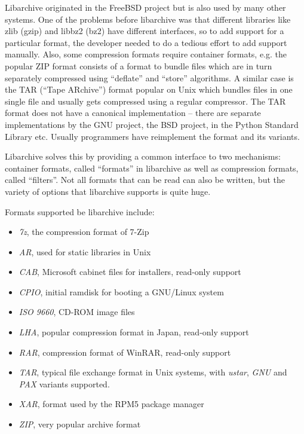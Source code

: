 \documentclass[parskip=half]{scrreprt}
\begin{document}
Libarchive originated in the FreeBSD project but is also used by many other
systems. One of the problems before libarchive was that different libraries
like zlib (gzip) and libbz2 (bz2) have different interfaces, so to add support
for a particular format, the developer needed to do a tedious effort to add
support manually. Also, some compression formats require container formats,
e.g. the popular ZIP format consists of a format to bundle files which are in
turn separately compressed using \enquote{deflate} and \enquote{store}
algorithms. A similar case is the TAR (\enquote{Tape ARchive}) format popular
on Unix which bundles files in one single file and usually gets compressed
using a regular compressor. The TAR format does not have a canonical
implementation -- there are separate implementations by the GNU project, the
BSD project, in the Python Standard Library etc. Usually programmers have
reimplement the format and its variants.

Libarchive solves this by providing a common interface to two mechanisms:
container formats, called \enquote{formats} in libarchive as well as
compression formats, called \enquote{filters}. Not all formats that can be read
can also be written, but the variety of options that libarchive supports is
quite huge.

Formats supported be libarchive include:

\begin{itemize}
  \item \emph{7z}, the compression format of 7-Zip
  \item \emph{AR}, used for static libraries in Unix
  \item \emph{CAB}, Microsoft cabinet files for installers, read-only support
  \item \emph{CPIO}, initial ramdisk for booting a GNU/Linux system
  \item \emph{ISO 9660}, CD-ROM image files
  \item \emph{LHA}, popular compression format in Japan, read-only support
  \item \emph{RAR}, compression format of WinRAR, read-only support
  \item \emph{TAR}, typical file exchange format in Unix systems, with
    \emph{ustar}, \emph{GNU} and \emph{PAX} variants supported.
  \item \emph{XAR}, format used by the RPM5 package manager
  \item \emph{ZIP}, very popular archive format
\end{itemize}
\end{document}
